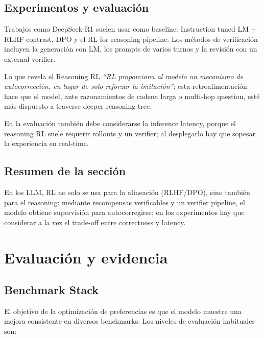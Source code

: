 \documentclass[a4paper]{article}
\begin{document}
\subsection{Experimentos y evaluación}

Trabajos como DeepSeek-R1 suelen usar como baseline: Instruction tuned LM + RLHF contrast, DPO y el RL for reasoning pipeline. Los métodos de verificación incluyen la generación con LM, los prompts de varios turnos y la revisión con un external verifier.

\begin{importantbox}{Lo que revela el Reasoning RL}
\textit{``RL proporciona al modelo un mecanismo de autocorrección, en lugar de solo reforzar la imitación''}: esta retroalimentación hace que el model, ante razonamientos de cadena larga o multi-hop question, esté más dispuesto a traverse deeper reasoning tree.
\end{importantbox}

En la evaluación también debe considerarse la inference latency, porque el reasoning RL suele requerir rollouts y un verifier; al desplegarlo hay que sopesar la experiencia en real-time.

\subsection{Resumen de la sección}

En los LLM, RL no solo se usa para la alineación (RLHF/DPO), sino también para el reasoning: mediante recompensas verificables y un verifier pipeline, el modelo obtiene supervisión para autocorregirse; en los experimentos hay que considerar a la vez el trade-off entre correctness y latency.
\section{Evaluación y evidencia}

\subsection{Benchmark Stack}

El objetivo de la optimización de preferencias es que el modelo muestre una mejora consistente en diversos benchmarks. Los niveles de evaluación habituales son:
\end{document}
